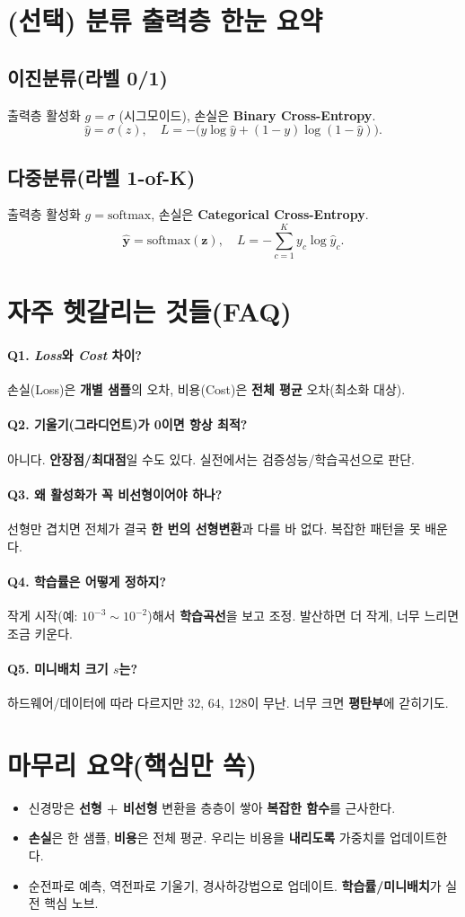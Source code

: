 \documentclass[12pt]{article}
\begin{document}
\section{(선택) 분류 출력층 한눈 요약}
\subsection*{이진분류(라벨 0/1)}
출력층 활성화 \(g=\sigma\) (시그모이드), 손실은 \textbf{Binary Cross-Entropy}.
\[
\hat{y}=\sigma(z),\quad
L=-\big(y\log \hat{y} + (1-y)\log(1-\hat{y})\big).
\]
\subsection*{다중분류(라벨 1-of-K)}
출력층 활성화 \(g=\text{softmax}\), 손실은 \textbf{Categorical Cross-Entropy}.
\[
\hat{\mathbf{y}}=\text{softmax}(\mathbf{z}),\quad
L=-\sum_{c=1}^{K} y_c\log \hat{y}_c.
\]

\section{자주 헷갈리는 것들(FAQ)}
\paragraph{Q1. \textit{Loss}와 \textit{Cost} 차이?}
손실(Loss)은 \textbf{개별 샘플}의 오차, 비용(Cost)은 \textbf{전체 평균} 오차(최소화 대상).

\paragraph{Q2. 기울기(그라디언트)가 0이면 항상 최적?}
아니다. \textbf{안장점/최대점}일 수도 있다. 실전에서는 검증성능/학습곡선으로 판단.

\paragraph{Q3. 왜 활성화가 꼭 비선형이어야 하나?}
선형만 겹치면 전체가 결국 \textbf{한 번의 선형변환}과 다를 바 없다. 복잡한 패턴을 못 배운다.

\paragraph{Q4. 학습률은 어떻게 정하지?}
작게 시작(예: $10^{-3}\sim 10^{-2}$)해서 \textbf{학습곡선}을 보고 조정. 발산하면 더 작게, 너무 느리면 조금 키운다.

\paragraph{Q5. 미니배치 크기 $s$는?}
하드웨어/데이터에 따라 다르지만 32, 64, 128이 무난. 너무 크면 \textbf{평탄부}에 갇히기도.

\section*{마무리 요약(핵심만 쏙)}
\begin{itemize}
  \item 신경망은 \textbf{선형 + 비선형} 변환을 층층이 쌓아 \textbf{복잡한 함수}를 근사한다.
  \item \textbf{손실}은 한 샘플, \textbf{비용}은 전체 평균. 우리는 비용을 \textbf{내리도록} 가중치를 업데이트한다.
  \item 순전파로 예측, 역전파로 기울기, 경사하강법으로 업데이트. \textbf{학습률/미니배치}가 실전 핵심 노브.
\end{itemize}
\end{document}
